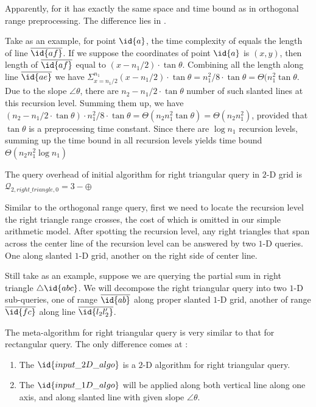 \begin{IEEEproof}
Apparently, for  it has exactly the same space
and time bound as in orthogonal range preprocessing. The difference lies in
.

Take  as an example, for point $\id{a}$,
the time complexity of  equals the length
of line $\overline{\id{af}}$.  If we suppose the coordinates of point
$\id{a}$ is $(x, y)$, then length of $\overline{\id{af}}$ equal to
$(x - n_1/2) \cdot \tan \theta$.  Combining all the length along line
$\overline{\id{ae}}$ we have $\Sigma_{x=n_1/2}^{n_1} (x - n_1/2) \cdot
\tan \theta = n_1^2/8 \cdot \tan \theta = \Theta(n_1^2 \tan \theta$. Due
to the slope $\angle \theta$, there are $n_2 - n_1/2 \cdot \tan \theta$
number of such slanted lines at this recursion level.  Summing them up,
we have $(n_2 - n_1/2 \cdot \tan \theta) \cdot n_1^2/8 \cdot \tan \theta =
\Theta(n_2 n_1^2 \tan \theta) = \Theta(n_2 n_1^2)$, provided that $\tan
\theta$ is a preprocessing time constant. Since there are $\log n_1$
recursion levels, summing up the time bound in all recursion levels
yields time bound $\Theta(n_2 n_1^2 \log n_1)$
\end{IEEEproof}

\begin{corollary}
The query overhead of initial algorithm for right triangular query in
$2$-D grid is $\mathcal{Q}_{2, right\_triangle, 0} = 3-\oplus$
\end{corollary}

\begin{IEEEproof}
Similar to the orthogonal range query, first we need to locate the
recursion level the right triangle range crosses, the cost of which
is omitted in our simple arithmetic model. After spotting the recursion
level, any right triangles that span across the center line of the recursion
level can be answered by two $1$-D queries. One along slanted $1$-D grid, 
another on the right side of center line. 

Still take  as an example, suppose we are 
querying the partial sum in right triangle $\triangle \id{abc}$.
We will decompose the right triangular query into two $1$-D sub-queries, 
one of range $\overline{\id{ab}}$ along proper slanted $1$-D grid, 
another of range $\overline{\id{fc}}$ along line $\overline{\id{l_2l_2'}}$.
\end{IEEEproof}

The meta-algorithm for right triangular query is very similar to that
for rectangular query. The only difference comes at :
\begin{enumerate}
\item The $\id{input\_2D\_algo}$ is a $2$-D algorithm for right triangular 
  query.
\item The $\id{input\_1D\_algo}$ will be applied along both vertical line
  along one axis, and along slanted line with given slope $\angle \theta$.
\end{enumerate}

